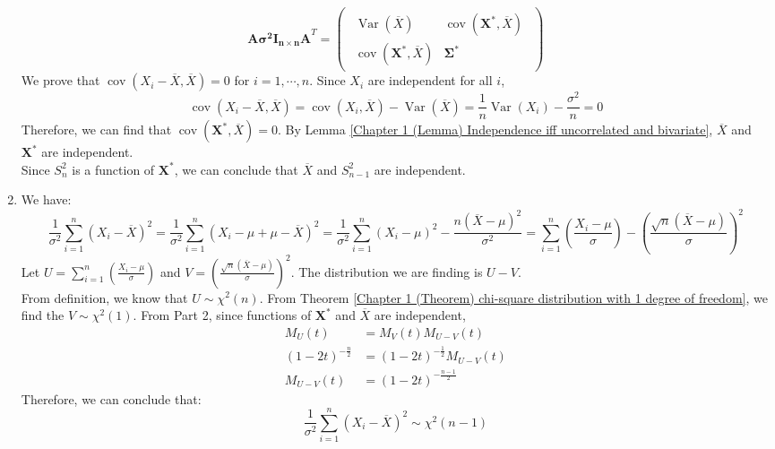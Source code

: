 \documentclass{huhtakm-template-book-v2}
\DeclareMathOperator{\Var}{Var}
\DeclareMathOperator{\cov}{cov}
\begin{document}
\begin{proofing}
\begin{enumerate}
		\begin{equation*}
			\mathbf{A\sigma^{2}I_{n\times n}A}^{T}=\begin{pmatrix}\begin{array}{c|c}
					\Var(\overline{X}) & \cov(\mathbf{X^{*}},\overline{X})\\
					\hline
					\cov(\mathbf{X^{*}},\overline{X}) & \mathbf{\Sigma^{*}}
			\end{array}\end{pmatrix}
		\end{equation*}
		We prove that $\cov(X_{i}-\overline{X},\overline{X})=0$ for $i=1,\cdots,n$. Since $X_{i}$ are independent for all $i$,
		\begin{equation*}
			\cov(X_{i}-\overline{X},\overline{X})=\cov(X_{i},\overline{X})-\Var(\overline{X})=\frac{1}{n}\Var(X_{i})-\frac{\sigma^{2}}{n}=0
		\end{equation*}
		Therefore, we can find that $\cov(\mathbf{X^{*}},\overline{X})=0$. By Lemma \ref{Chapter 1 (Lemma) Independence iff uncorrelated and bivariate}, $\overline{X}$ and $\mathbf{X^{*}}$ are independent.\\
		Since $S_{n}^{2}$ is a function of $\mathbf{X^{*}}$, we can conclude that $\overline{X}$ and $S_{n-1}^{2}$ are independent.
		\item We have:
		\begin{equation*}
			\frac{1}{\sigma^{2}}\sum_{i=1}^{n}(X_{i}-\overline{X})^{2}=\frac{1}{\sigma^{2}}\sum_{i=1}^{n}(X_{i}-\mu+\mu-\overline{X})^{2}=\frac{1}{\sigma^{2}}\sum_{i=1}^{n}(X_{i}-\mu)^{2}-\frac{n(\overline{X}-\mu)^{2}}{\sigma^{2}}=\sum_{i=1}^{n}\left(\frac{X_{i}-\mu}{\sigma}\right)-\left(\frac{\sqrt{n}(\overline{X}-\mu)}{\sigma}\right)^{2}
		\end{equation*}
		Let $U=\sum_{i=1}^{n}\left(\frac{X_{i}-\mu}{\sigma}\right)$ and $V=\left(\frac{\sqrt{n}(\overline{X}-\mu)}{\sigma}\right)^{2}$. The distribution we are finding is $U-V$.\\
		From definition, we know that $U\sim\chi^{2}(n)$. From Theorem \ref{Chapter 1 (Theorem) chi-square distribution with 1 degree of freedom}, we find the $V\sim\chi^{2}(1)$. From Part 2, since functions of $\mathbf{X}^{*}$ and $\overline{X}$ are independent, 
		\begin{align*}
			M_{U}(t)&=M_{V}(t)M_{U-V}(t)\\
			(1-2t)^{-\frac{n}{2}}&=(1-2t)^{-\frac{1}{2}}M_{U-V}(t)\\
			M_{U-V}(t)&=(1-2t)^{-\frac{n-1}{2}}
		\end{align*}
		Therefore, we can conclude that:
		\begin{equation*}
			\frac{1}{\sigma^{2}}\sum_{i=1}^{n}(X_{i}-\overline{X})^{2}\sim\chi^{2}(n-1)
		\end{equation*}
	\end{enumerate}
\end{proofing}
\end{document}
